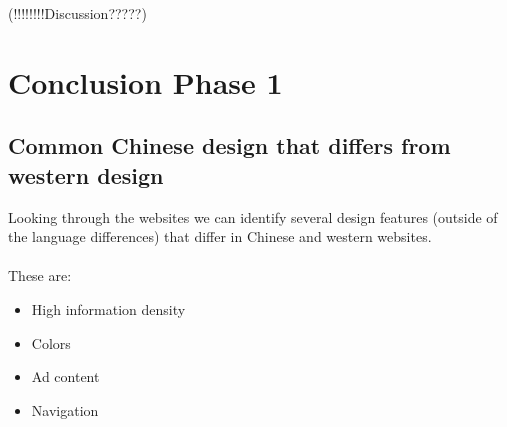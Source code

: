  
 (!!!!!!!!Discussion?????)
\newpage
 \section{Conclusion Phase 1}
 \subsection{Common Chinese design that differs from western design}
Looking through the websites we can identify several design features (outside of the language differences) that differ in Chinese and western websites. 
\\\\
These are:
 \begin{itemize}
 \item High information density
 \item Colors
 \item Ad content
 \item Navigation
 \end{itemize}
 
